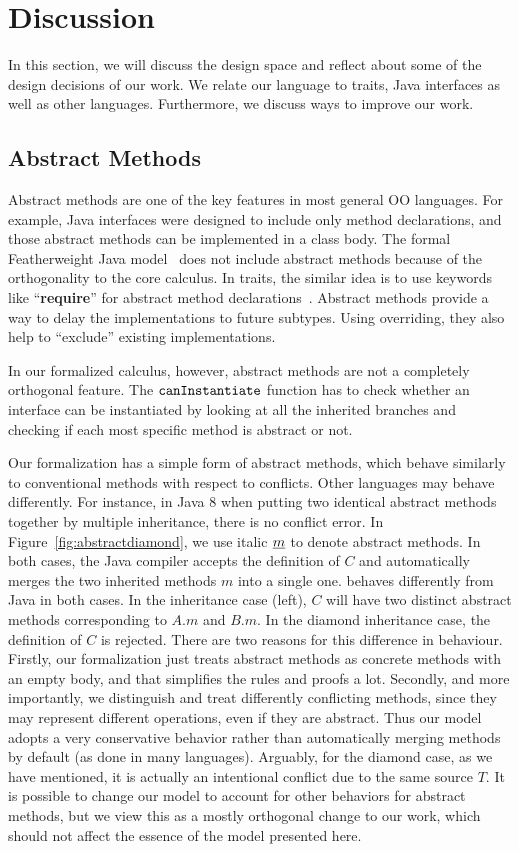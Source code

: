 \section{Discussion}\label{sec:discussion}
In this section, we will discuss the design space and reflect about some of the design decisions of our work. We relate 
our language to traits, Java interfaces as well as other languages. Furthermore, we discuss
ways to improve our work.

\subsection{Abstract Methods}

Abstract methods are one of the key features in most general OO languages. For example, Java interfaces were designed
to include only method declarations, and those abstract methods can be implemented in a class body. 
The formal Featherweight Java model~\cite{Igarashi01FJ} does not include abstract methods because of the orthogonality
to the core calculus. In traits, the
similar idea is to use keywords like ``\textbf{require}'' for abstract method declarations~\cite{scharli03traits}.
Abstract methods provide a way to
delay the implementations to future subtypes. Using overriding, they also help to ``exclude'' existing implementations.

In our formalized calculus, however, abstract methods are not a completely orthogonal feature. The $\texttt{canInstantiate}$ function
has to check whether an interface can be instantiated by looking at all the inherited branches and checking if each most specific method is abstract or not.

Our formalization has a simple form of abstract methods, which behave similarly to conventional methods with respect to conflicts.
Other languages may behave differently. 
For instance, in Java 8 when putting two identical abstract methods together by multiple inheritance, there is no conflict error. In Figure~\ref{fig:abstractdiamond}, we use italic $\emph{m}$ to denote abstract methods. In both cases, the Java compiler accepts the definition of $C$ and automatically merges the two inherited methods $m$ into a single one. \MIM{} behaves differently from Java in both cases.
In the \wordfork{} inheritance case (left), $C$ will have two distinct abstract methods corresponding to $A.m$ and $B.m$. 
In the diamond inheritance case, the definition of $C$ is rejected. 
There are two reasons for this difference in behaviour. Firstly, our formalization just treats abstract methods as concrete methods with an empty body, and that simplifies
the rules and proofs a lot. Secondly, and more importantly, we distinguish and treat differently conflicting methods, since they may represent different operations, even if they are abstract. Thus our model adopts a very conservative behavior rather than automatically merging 
methods by default (as done in many languages). 
Arguably, for the diamond case, as we have mentioned, it is actually an intentional conflict due to the same source $T$.
It is possible to change our model to account for other behaviors for abstract methods, but we view this as a mostly 
orthogonal change to our work, which should not affect the essence of the model presented here.

